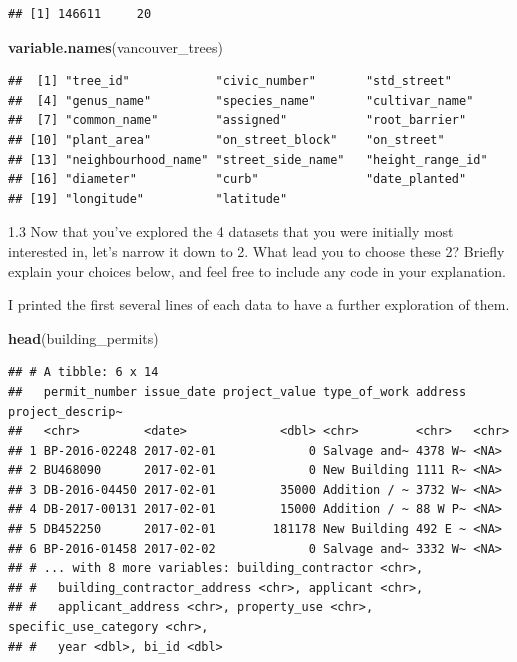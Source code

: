 \documentclass[
]{article}
\newenvironment{Shaded}{\begin{snugshade}}{\end{snugshade}}
\newcommand{\KeywordTok}[1]{\textcolor[rgb]{0.13,0.29,0.53}{\textbf{#1}}}
\newcommand{\NormalTok}[1]{#1}
\begin{document}
\begin{verbatim}
## [1] 146611     20
\end{verbatim}

\begin{Shaded}
\begin{Highlighting}[]
\KeywordTok{variable.names}\NormalTok{(vancouver\_trees)}
\end{Highlighting}
\end{Shaded}

\begin{verbatim}
##  [1] "tree_id"            "civic_number"       "std_street"        
##  [4] "genus_name"         "species_name"       "cultivar_name"     
##  [7] "common_name"        "assigned"           "root_barrier"      
## [10] "plant_area"         "on_street_block"    "on_street"         
## [13] "neighbourhood_name" "street_side_name"   "height_range_id"   
## [16] "diameter"           "curb"               "date_planted"      
## [19] "longitude"          "latitude"
\end{verbatim}

1.3 Now that you've explored the 4 datasets that you were initially most
interested in, let's narrow it down to 2. What lead you to choose these
2? Briefly explain your choices below, and feel free to include any code
in your explanation.

I printed the first several lines of each data to have a further
exploration of them.

\begin{Shaded}
\begin{Highlighting}[]
\KeywordTok{head}\NormalTok{(building\_permits)}
\end{Highlighting}
\end{Shaded}

\begin{verbatim}
## # A tibble: 6 x 14
##   permit_number issue_date project_value type_of_work address project_descrip~
##   <chr>         <date>             <dbl> <chr>        <chr>   <chr>           
## 1 BP-2016-02248 2017-02-01             0 Salvage and~ 4378 W~ <NA>            
## 2 BU468090      2017-02-01             0 New Building 1111 R~ <NA>            
## 3 DB-2016-04450 2017-02-01         35000 Addition / ~ 3732 W~ <NA>            
## 4 DB-2017-00131 2017-02-01         15000 Addition / ~ 88 W P~ <NA>            
## 5 DB452250      2017-02-01        181178 New Building 492 E ~ <NA>            
## 6 BP-2016-01458 2017-02-02             0 Salvage and~ 3332 W~ <NA>            
## # ... with 8 more variables: building_contractor <chr>,
## #   building_contractor_address <chr>, applicant <chr>,
## #   applicant_address <chr>, property_use <chr>, specific_use_category <chr>,
## #   year <dbl>, bi_id <dbl>
\end{verbatim}
\end{document}
